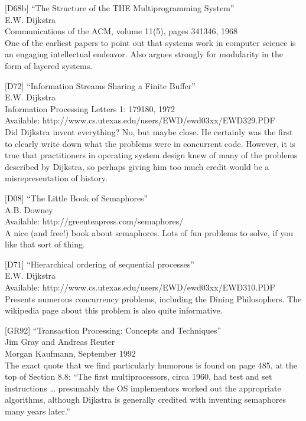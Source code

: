 {[}D68b{]} ``The Structure of the THE Multiprogramming System''\\
E.W. Dijkstra\\
Communications of the ACM, volume 11(5), pages 341346, 1968\\
One of the earliest papers to point out that systems work in computer
science is an engaging intellectual endeavor. Also argues strongly for
modularity in the form of layered systems.

{[}D72{]} ``Information Streams Sharing a Finite Buffer''\\
E.W. Dijkstra\\
Information Processing Letters 1: 179180, 1972\\
Available: http://www.cs.utexas.edu/users/EWD/ewd03xx/EWD329.PDF\\
Did Dijkstra invent everything? No, but maybe close. He certainly was
the first to clearly write down what the problems were in concurrent
code. However, it is true that practitioners in operating system design
knew of many of the problems described by Dijkstra, so perhaps giving
him too much credit would be a misrepresentation of history.

{[}D08{]} ``The Little Book of Semaphores''\\
A.B. Downey\\
Available: http://greenteapress.com/semaphores/\\
A nice (and free!) book about semaphores. Lots of fun problems to solve,
if you like that sort of thing.

{[}D71{]} ``Hierarchical ordering of sequential processes''\\
E.W. Dijkstra\\
Available: http://www.cs.utexas.edu/users/EWD/ewd03xx/EWD310.PDF\\
Presents numerous concurrency problems, including the Dining
Philosophers. The wikipedia page about this problem is also quite
informative.

{[}GR92{]} ``Transaction Processing: Concepts and Techniques''\\
Jim Gray and Andreas Reuter\\
Morgan Kaufmann, September 1992\\
The exact quote that we find particularly humorous is found on page 485,
at the top of Section 8.8: ``The first multiprocessors, circa 1960, had
test and set instructions \ldots{} presumably the OS implementors worked
out the appropriate algorithms, although Dijkstra is generally credited
with inventing semaphores many years later.''

